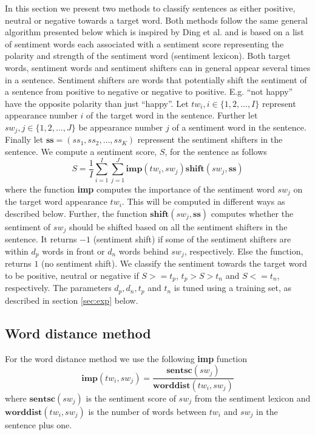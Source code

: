 \documentclass[11pt]{article}
\begin{document}
In this section we present two methods to classify sentences as either positive, neutral or negative towards a target word. Both methods follow the same general algorithm presented below which is inspired by Ding et al.  and is based on a list of sentiment words each associated with a sentiment score representing the polarity and strength of the sentiment word (sentiment lexicon). Both target words, sentiment words and sentiment shifters can in general appear several times in a sentence. Sentiment shifters are words that potentially shift the sentiment of a sentence from positive to negative or negative to positive. E.g. ``not happy'' have the opposite polarity than just ``happy''. Let $tw_i, i \in \{1,2,\ldots,I\}$ represent appearance number $i$ of the target word in the sentence. Further let $sw_{j}, j \in \{1,2,\ldots,J\}$ be appearance number $j$ of a sentiment word in the sentence. Finally let $\textbf{ss} = (ss_1, ss_2, \ldots, ss_K)$ repressent the sentiment shifters in the sentence. We compute a sentiment score, $S$, for the sentence as follows
\begin{equation}
  \label{eq:1}
  S = \frac{1}{I}\sum_{i=1}^{I} \sum_{j=1}^{J} \mathbf{imp}(tw_i, sw_{j})\mathbf{shift}(sw_{j}, \mathbf{ss})    
\end{equation}
where the function \textbf{imp} computes the importance of the sentiment word $sw_{j}$ on the target word appearance $tw_i$. This will be computed in different ways as described below. Further, the function $\mathbf{shift}(sw_{j}, \mathbf{ss})$ computes whether the sentiment of $sw_{j}$ should be shifted based on all the sentiment shifters in the sentence. It returns $-1$ (sentiment shift) if some of the sentiment shifters are within $d_{p}$ words in front or $d_{n}$ words behind $sw_{j}$, respectively. Else the function, returns $1$ (no sentiment shift). We classify the sentiment towards the target word to be positive, neutral or negative if $S >= t_p$,  $t_p > S > t_n$ and  $S <= t_n$, respectively. The parameters $d_p, d_n, t_p$ and $t_n$ is tuned using a training set, as described in section \ref{sec:exp} below.

\subsection{Word distance method}
\label{sec:wd}

For the word distance method we use the following \textbf{imp} function
\begin{equation}
  \label{eq:2}
  \mathbf{imp}(tw_i, sw_{j}) = \frac{\mathbf{sentsc}(sw_{j})}{\mathbf{worddist}(tw_i, sw_{j})}
\end{equation}
where $\mathbf{sentsc}(sw_{j})$ is the sentiment score of $sw_{j}$ from the sentiment lexicon and $\mathbf{worddist}(tw_i, sw_{j})$ is the number of words between $tw_i$ and $sw_{j}$ in the sentence plus one.
\end{document}
